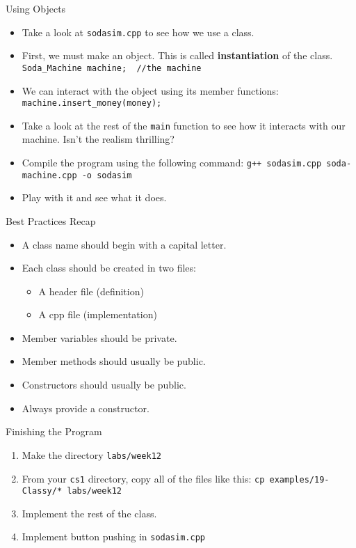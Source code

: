 \documentclass[]{beamer}
\begin{document}
\begin{frame}[fragile]{Using Objects}
    \begin{itemize}[<+->]
        \item Take a look at \texttt{sodasim.cpp} to see how we use
            a class.
        \item First, we must make an object. This is called
            \textbf{instantiation} of the class.
            \newline\verb!Soda_Machine machine;  //the machine!
        \item We can interact with the object using its member
            functions:
            \newline\verb!machine.insert_money(money);!
        \item Take a look at the rest of the \texttt{main} function to
            see how it interacts with our machine. Isn't the realism
            thrilling?
        \item Compile the program using the following command:
            \newline\verb!g++ sodasim.cpp soda-machine.cpp -o sodasim!
        \item Play with it and see what it does.
    \end{itemize}
\end{frame}

\begin{frame}{Best Practices Recap}
    \begin{itemize}[<+->]
        \item A class name should begin with a capital letter.
        \item Each class should be created in two files:
            \begin{itemize}
                \item A header file (definition)
                \item A cpp file (implementation)
            \end{itemize}
        \item Member variables should be private.
        \item Member methods should usually be public.
        \item Constructors should usually be public.
        \item Always provide a constructor.
    \end{itemize}
\end{frame}

\begin{frame}[fragile]{Finishing the Program}
    \begin{enumerate}
        \item Make the directory \texttt{labs/week12}
        \item From your \texttt{cs1} directory, copy all of the files
            like this:
            \newline\verb!cp examples/19-Classy/* labs/week12!
        \item Implement the rest of the class.  
        \item Implement button pushing in \texttt{sodasim.cpp}
    \end{enumerate}
\end{frame}
\end{document}
